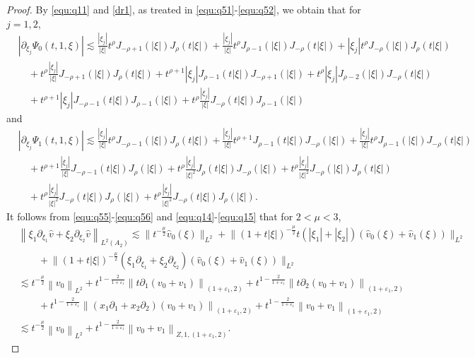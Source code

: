 \documentclass[11pt,twoside]{article}
\newcommand{\p}{\partial}
\newcommand{\f}{\frac}
\theoremstyle{plain}
\theoremstyle{definition}
\theoremstyle{remark}
\numberwithin{equation}{section}
\begin{document}
\begin{proof}
By \eqref{equ:q11} and \eqref{dr1}, as treated in \eqref{equ:q51}-\eqref{equ:q52}, we obtain that for $j=1,2$,
\begin{equation}\label{equ:q55}
\begin{aligned}
& |\p_{\xi_j}\Psi_0(t, 1, \xi)|
\lesssim \frac{|\xi_j|}{|\xi|} t^\rho J_{-\rho+1}(|\xi|) J_\rho(t|\xi|)+\frac{|\xi_j|}{|\xi|} t^\rho J_{\rho-1}(|\xi|) J_{-\rho}(t|\xi|)
+|\xi_j| t^\rho J_{-\rho}(|\xi|) J_\rho(t|\xi|)\\
&\quad +t^{\rho}\f{|\xi_j|}{|\xi|} J_{-\rho+1}(|\xi|) J_{\rho}(t|\xi|) +t^{\rho+1}|\xi_j| J_{\rho-1}(t|\xi|) J_{-\rho+1}(|\xi|)
+t^\rho|\xi_j| J_{\rho-2}(|\xi|) J_{-\rho}(t|\xi|)\\
&\quad +t^{\rho+1}|\xi_j| J_{-\rho-1}(t|\xi|) J_{\rho-1}(|\xi|)+t^{\rho}\f{|\xi_j|}{|\xi|} J_{-\rho}(t|\xi|) J_{\rho-1}(|\xi|)
\end{aligned}
\end{equation}
and
\begin{equation}\label{equ:q56}
\begin{aligned}
&|\p_{\xi_j}\Psi_1(t, 1, \xi)|
\lesssim \frac{|\xi_j|}{|\xi|} t^\rho J_{-\rho-1}(|\xi|) J_\rho(t|\xi|)+\frac{|\xi_j|}{|\xi|} t^{\rho+1} J_{\rho-1}(t|\xi|) J_{-\rho}(|\xi|)+\f{|\xi_j|}{|\xi|} t^\rho J_{\rho-1}(|\xi|) J_{-\rho}(t|\xi|)\\
&\quad +t^{\rho+1}\f{|\xi_j|}{|\xi|} J_{-\rho-1}(t|\xi|) J_{\rho}(|\xi|) +t^{\rho}\f{|\xi_j|}{|\xi|^2} J_{\rho}(t|\xi|) J_{-\rho}(|\xi|)+t^\rho\f{|\xi_j|}{|\xi|^2} J_{-\rho}(|\xi|) J_{\rho}(t|\xi|)\\
&\quad +t^{\rho}\f{|\xi_j|}{|\xi|^2} J_{-\rho}(t|\xi|) J_{\rho}(|\xi|)+t^{\rho}\f{|\xi_j|}{|\xi|^2} J_{-\rho}(t|\xi|) J_{\rho}(|\xi|).
\end{aligned}
\end{equation}
It follows from \eqref{equ:q55}-\eqref{equ:q56} and \eqref{equ:q14}-\eqref{equ:q15} that for $2<\mu<3$,
\begin{equation}\label{equ:q59}
\begin{aligned}
&\left\|\xi_1\p_{\xi_1}\hat{v}+\xi_2\p_{\xi_2}\hat{v}\right\|_{L^2(A_2)}
\lesssim \big\|t^{-\frac{\mu}{2}}\hat{v}_{0}(\xi)\big\|_{L^{2}}
+\big\|(1+t|\xi|)^{-\frac{\mu}{2}}t(|\xi_1|+|\xi_2|)(\hat{v}_{0}(\xi)+\hat{v}_{1}(\xi))\big\|_{L^{2}}\\
&\qquad +\big\|(1+t|\xi|)^{-\f{\mu}{2}}(\xi_1\p_{\xi_1}+\xi_2\p_{\xi_2})(\hat{v}_{0}(\xi)+\hat{v}_{1}(\xi))\big\|_{L^{2}}\\
&\lesssim  t^{-\frac{\mu}{2}}\left\|v_{0}\right\|_{L^{2}}+t^{1-\f{2}{1+\varepsilon_1}}\left\|t\p_1(v_0+v_1)\right\|_{(1+\varepsilon_1, 2)}+t^{1-\f{2}{1+\varepsilon_1}}\left\|t\p_2(v_0+v_1)\right\|_{(1+\varepsilon_1, 2)}\\
&\qquad+ t^{1-\f{2}{1+\varepsilon_1}}\left\|(x_1\p_1+x_2\p_2)(v_0+v_1)\right\|_{(1+\varepsilon_1, 2)}+t^{1-\f{2}{1+\varepsilon_1}}\left\|v_0+v_1\right\|_{(1+\varepsilon_1, 2)}\\
&\lesssim t^{-\frac{\mu}{2}}\left\|v_{0}\right\|_{L^{2}}+ t^{1-\f{2}{1+\varepsilon_1}}\left\|v_0+v_1\right\|_{Z, 1, (1+\varepsilon_1, 2)}.
\end{aligned}
\end{equation}


\end{proof}
\end{document}
